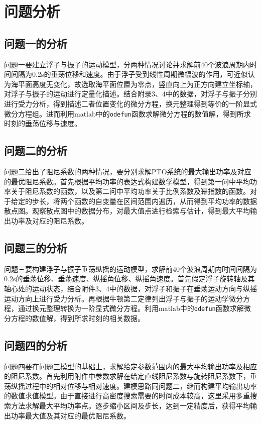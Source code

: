\documentclass{article}
\numberwithin{equation}{subsection}
\begin{document}
{\centering\section{问题分析}}

\subsection{问题一的分析}
问题一要建立浮子与振子的运动模型，分两种情况讨论并求解前40个波浪周期内时间间隔为0.2s的垂荡位移和速度。由于浮子受到线性周期微幅波的作用，可近似认为海平面高度无变化，故选取海平面位置为零点，竖直向上为正方向建立坐标轴，对浮子与振子的运动进行定量化描述。结合附录3、4中的数据，对浮子与振子分别进行受力分析，得到描述二者位置变化的微分方程，换元整理得到等价的一阶显式微分方程组。进而利用matlab中的\verb|odefun|函数求解微分方程的数值解，得到所求时刻的垂荡位移与速度。%
\subsection{问题二的分析}
问题二给出了阻尼系数的两种情况，要分别求解PTO系统的最大输出功率及对应的最优阻尼系数。首先根据平均功率的表达式构建数学模型，得到第一问中平均功率关于阻尼系数的函数，以及第二问中平均功率关于比例系数及幂指数的函数。对于给定的步长，将两个函数的自变量在区间范围内遍历，从而得到平均功率的数据散点图。观察散点图中的数据分布，对最大值点进行检索与估计，得到最大平均输出功率及对应的阻尼系数。
\subsection{问题三的分析}
问题三要构建浮子与振子垂荡纵摇的运动模型，求解前40个波浪周期内时间间隔为0.2s的垂荡位移、垂荡速度、纵摇角位移、纵摇角速度。首先假定浮子旋转轴及其轴心处的运动状态，结合附件3、4中的数据，对浮子和振子在垂荡运动方向与纵摇运动方向上进行受力分析。再根据牛顿第二定律列出浮子与振子的运动学微分方程，通过换元整理转换为一阶显式微分方程。利用matlab中的\verb|odefun|函数求解微分方程的数值解，得到所求时刻的相关数据。
\subsection{问题四的分析}
问题四要在问题三模型的基础上，求解给定参数范围内的最大平均输出功率及相应的阻尼系数。首先利用附件中参数求解在给定直线阻尼系数与旋转阻尼系数下，垂荡纵摇过程中的相对位移与相对速度。建模思路同问题二，继而构建平均输出功率的数值求值模型。由于直接进行高密度搜索需要的时间成本较高，这里采用多重搜索方法求解最大平均功率点。逐步缩小区间及步长，达到一定精度后，获得平均输出功率最大值及其对应的最优阻尼系数。
\end{document}
